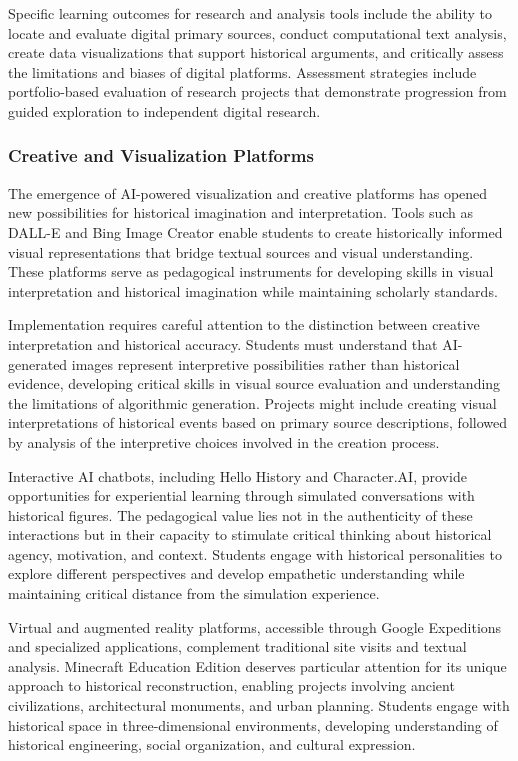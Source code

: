 Specific learning outcomes for research and analysis tools include the ability to locate and evaluate digital primary sources, conduct computational text analysis, create data visualizations that support historical arguments, and critically assess the limitations and biases of digital platforms. Assessment strategies include portfolio-based evaluation of research projects that demonstrate progression from guided exploration to independent digital research.

\subsubsection {Creative and Visualization Platforms}

The emergence of AI-powered visualization and creative platforms has opened new possibilities for historical imagination and interpretation. Tools such as DALL-E and Bing Image Creator enable students to create historically informed visual representations that bridge textual sources and visual understanding. These platforms serve as pedagogical instruments for developing skills in visual interpretation and historical imagination while maintaining scholarly standards.

Implementation requires careful attention to the distinction between creative interpretation and historical accuracy. Students must understand that AI-generated images represent interpretive possibilities rather than historical evidence, developing critical skills in visual source evaluation and understanding the limitations of algorithmic generation. Projects might include creating visual interpretations of historical events based on primary source descriptions, followed by analysis of the interpretive choices involved in the creation process.

Interactive AI chatbots, including Hello History and Character.AI, provide opportunities for experiential learning through simulated conversations with historical figures. The pedagogical value lies not in the authenticity of these interactions but in their capacity to stimulate critical thinking about historical agency, motivation, and context. Students engage with historical personalities to explore different perspectives and develop empathetic understanding while maintaining critical distance from the simulation experience.

Virtual and augmented reality platforms, accessible through Google Expeditions and specialized applications, complement traditional site visits and textual analysis. Minecraft Education Edition deserves particular attention for its unique approach to historical reconstruction, enabling projects involving ancient civilizations, architectural monuments, and urban planning. Students engage with historical space in three-dimensional environments, developing understanding of historical engineering, social organization, and cultural expression.

